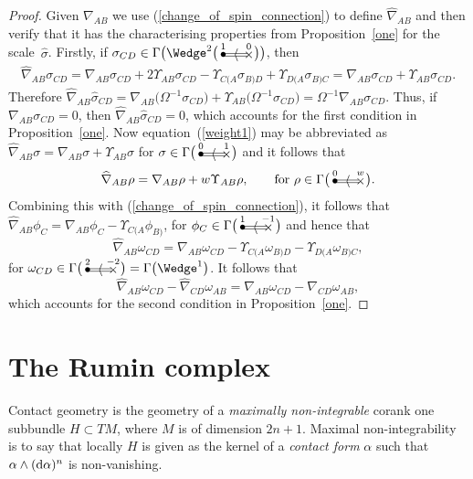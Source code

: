\documentclass[pdftex]{sigma}%
\numberwithin{equation}{section}
\newcommand{\btwo}[2]{\begin{picture}(28,11)
\put(4,1.5){\makebox(0,0){$\bullet$}}
\put(24,1.5){\makebox(0,0){$\times$}}
\put(23,2.5){\line(-1,0){20}}
\put(23,0.5){\line(-1,0){20}}
\put(14,1.5){\makebox(0,0){$\langle$}}
\put(4,8){\makebox(0,0){$\scriptstyle #1$}}
\put(24,8){\makebox(0,0){$\scriptstyle #2$}}
\end{picture}}
\begin{document}
\begin{proof} Given $\nabla_{AB}$ we use (\ref{change_of_spin_connection}) to
define $\widehat\nabla_{AB}$ and then verify that it has the characterising
properties from Proposition~\ref{one} for the scale~$\widehat\sigma$. Firstly,
if $\sigma_{CD}\in\Gamma\big({\Wedge}^2\big(\btwo{1}{0}\big)\big)$, then
\begin{gather}\label{weight1}
\widehat\nabla_{AB}\sigma_{CD}=\nabla_{AB}\sigma_{CD}
+2\Upsilon_{AB}\sigma_{CD}-\Upsilon_{C(A}\sigma_{B)D}
+\Upsilon_{D(A}\sigma_{B)C}=\nabla_{AB}\sigma_{CD}
+\Upsilon_{AB}\sigma_{CD}.\!\!\!\!\!\end{gather}
Therefore $\widehat\nabla_{AB}\widehat\sigma_{CD}
=\nabla_{AB}\big(\Omega^{-1}\sigma_{CD}\big) +\Upsilon_{AB}\big(\Omega^{-1}\sigma_{CD}\big)
=\Omega^{-1}\nabla_{AB}\sigma_{CD}$. Thus, if
$\nabla_{AB}\sigma_{CD}=0$, then $\widehat\nabla_{AB}\widehat\sigma_{CD}=0$,
which accounts for the first condition in Proposition~\ref{one}. Now equation~(\ref{weight1}) may be abbreviated as
$\widehat\nabla_{AB}\sigma=\nabla_{AB}\sigma+\Upsilon_{AB}\sigma$ for
$\sigma\in\Gamma\big(\btwo{0}{1}\big)$ and it follows that
\[\widehat\nabla_{AB}\rho=\nabla_{AB}\rho+w\Upsilon_{AB}\rho,\qquad
\mbox{for}\ \rho\in\Gamma\big(\btwo{0}{w}\big).\]
Combining this with (\ref{change_of_spin_connection}), it follows
that $\widehat\nabla_{AB}\phi_C=\nabla_{AB}\phi_C-\Upsilon_{C(A}\phi_{B)}$,
for $\phi_C\in\Gamma\big(\btwo{1}{-1}\,\big)$ and hence that
\[\widehat\nabla_{AB}\omega_{CD}=\nabla_{AB}\omega_{CD}
-\Upsilon_{C(A}\omega_{B)D}-\Upsilon_{D(A}\omega_{B)C},\]
for $\omega_{CD}\in\Gamma\big(\btwo{2}{-2}\,\big)=\Gamma\big({\Wedge}^1\big)$. It follows that
\[\widehat\nabla_{AB}\omega_{CD}-\widehat\nabla_{CD}\omega_{AB}
=\nabla_{AB}\omega_{CD}-\nabla_{CD}\omega_{AB},\]
which accounts for the second condition in Proposition~\ref{one}.
\end{proof}

\section{The Rumin complex}\label{rumin}
Contact geometry is the geometry of a \textit{maximally non-integrable}
corank one subbundle $H\subset TM$, where $M$ is of dimension $2n+1$. Maximal
non-integrability is to say that locally $H$ is given as the kernel of a
\textit{contact form} $\alpha$ such that $\alpha \wedge ({\rm d}\alpha)^n$ is
non-vanishing.
\end{document}

